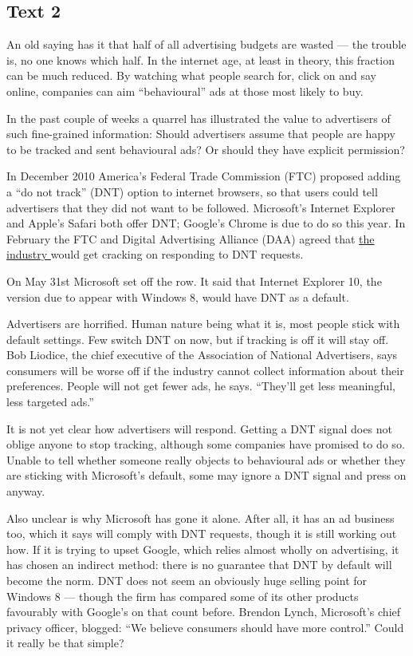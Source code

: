 \documentclass[UTF8,11pt]{ctexart}
\begin{document}
\subsection*{\textbf{Text 2}}


An old saying has it that half of all advertising budgets are wasted — the trouble is, no one knows which half. In the internet age, at least in theory, this fraction can be much reduced. By watching what people search for, click on and say online, companies can aim “behavioural” ads at those most likely to buy.


In the past couple of weeks a quarrel has illustrated the value to advertisers of such fine-grained information: Should advertisers assume that people are happy to be tracked and sent behavioural ads? Or should they have explicit permission?


In December 2010 America’s Federal Trade Commission (FTC) proposed adding a “do not track” (DNT) option to internet browsers, so that users could tell advertisers that they did not want to be followed. Microsoft’s Internet Explorer and Apple’s Safari both offer DNT; Google’s Chrome is due to do so this year. In February the FTC and Digital Advertising Alliance (DAA) agreed that \uline{the industry }would get cracking on responding to DNT requests.


On May 31st Microsoft set off the row. It said that Internet Explorer 10, the version due to appear with Windows 8, would have DNT as a default.


Advertisers are horrified. Human nature being what it is, most people stick with default settings. Few switch DNT on now, but if tracking is off it will stay off. Bob Liodice, the chief executive of the Association of National Advertisers, says consumers will be worse off if the industry cannot collect information about their preferences. People will not get fewer ads, he says. “They’ll get less meaningful, less targeted ads.”


It is not yet clear how advertisers will respond. Getting a DNT signal does not oblige anyone to stop tracking, although some companies have promised to do so. Unable to tell whether someone really objects to behavioural ads or whether they are sticking with Microsoft’s default, some may ignore a DNT signal and press on anyway.


Also unclear is why Microsoft has gone it alone. After all, it has an ad business too, which it says will comply with DNT requests, though it is still working out how. If it is trying to upset Google, which relies almost wholly on advertising, it has chosen an indirect method: there is no guarantee that DNT by default will become the norm. DNT does not seem an obviously huge selling point for Windows 8 — though the firm has compared some of its other products favourably with Google’s on that count before. Brendon Lynch, Microsoft’s chief privacy officer, blogged: “We believe consumers should have more control.” Could it really be that simple?
\end{document}
